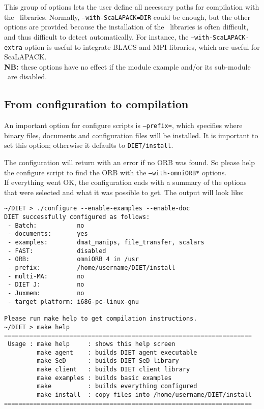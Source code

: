 \noindent This group of options lets the user define all necessary
paths for compilation with the \scalapack\ libraries. Normally,
\texttt{--with-ScaLAPACK=DIR} could be enough, but the other options
are provided because the installation of the \scalapack\ libraries is
often difficult, and thus difficult to detect automatically. For
instance, the \texttt{--with-ScaLAPACK-extra} option is useful to
integrate BLACS and MPI libraries, which are useful for ScaLAPACK.  \\
\textbf{NB:} these options have no effect if the module example and/or
its sub-module \scalapack\ are disabled.

\subsection{From configuration to compilation}

An important option for configure scripts is \texttt{--prefix=}, which
specifies where binary files, documents and configuration files will
be installed. It is important to set this option; otherwise it 
defaults to \texttt{DIET/install}.

The configuration will return with an error if no ORB was found. So
please help the configure script to find the ORB with the
\texttt{--with-omniORB*} options.\\


If everything went OK, the configuration ends with a summary of the
options that were selected and what it was possible to get. The output
will look like: {\footnotesize
\begin{verbatim}
~/DIET > ./configure --enable-examples --enable-doc
DIET successfully configured as follows:
 - Batch:           no
 - documents:       yes
 - examples:        dmat_manips, file_transfer, scalars
 - FAST:            disabled
 - ORB:             omniORB 4 in /usr
 - prefix:          /home/username/DIET/install
 - multi-MA:        no
 - DIET J:          no
 - Juxmem:          no
 - target platform: i686-pc-linux-gnu
 
Please run make help to get compilation instructions.
~/DIET > make help
====================================================================
 Usage : make help     : shows this help screen
         make agent    : builds DIET agent executable
         make SeD      : builds DIET SeD library
         make client   : builds DIET client library
         make examples : builds basic examples
         make          : builds everything configured
         make install  : copy files into /home/username/DIET/install
====================================================================
\end{verbatim}
}

